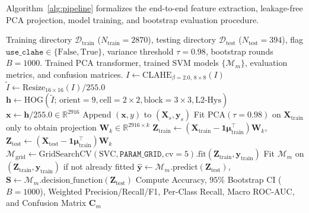 \documentclass[conference]{IEEEtran}
\begin{document}
Algorithm~\ref{alg:pipeline} formalizes the end-to-end feature extraction, leakage-free PCA projection, model training, and bootstrap evaluation procedure.

\begin{algorithm}[t]
\caption{End-to-End Brain Tumor MRI Classification with Optional Pre-Downsampling CLAHE, HOG, PCA, and SVM}
\label{alg:pipeline}
\footnotesize
\begin{algorithmic}[1]
\Require Training directory $\mathcal{D}_{\text{train}}$ ($N_{\text{train}}=2870$), testing directory $\mathcal{D}_{\text{test}}$ ($N_{\text{test}}=394$), flag $\texttt{use\_clahe} \in \{\text{False}, \text{True}\}$, variance threshold $\tau = 0.98$, bootstrap rounds $B = 1000$.
\Ensure Trained PCA transformer, trained SVM models $\{\mathcal{M}_m\}$, evaluation metrics, and confusion matrices.
            \State $I \gets \text{CLAHE}_{\beta=2.0, \, 8\times 8}(I)$ 
        \EndIf
        \State $\tilde{I} \gets \text{Resize}_{16 \times 16}(I) / 255.0$
        \State $\mathbf{h} \gets \text{HOG}(\tilde{I}; \, \text{orient}=9, \text{cell}=2\times 2, \text{block}=3\times 3, \text{L2-Hys})$
        \State $\mathbf{x} \gets \mathbf{h} / 255.0 \in \mathbb{R}^{2916}$
        \State Append $(\mathbf{x}, y)$ to $(\mathbf{X}_s, \mathbf{y}_s)$
    \EndFor
\EndFor
\State Fit $\text{PCA}(\tau=0.98)$ on $\mathbf{X}_{\text{train}}$ only to obtain projection $\mathbf{W}_k \in \mathbb{R}^{2916 \times k}$
\State $\mathbf{Z}_{\text{train}} \gets (\mathbf{X}_{\text{train}} - \mathbf{1}\boldsymbol{\mu}_{\text{train}}^\top)\mathbf{W}_k$, \quad $\mathbf{Z}_{\text{test}} \gets (\mathbf{X}_{\text{test}} - \mathbf{1}\boldsymbol{\mu}_{\text{train}}^\top)\mathbf{W}_k$
\State $\mathcal{M}_{\text{grid}} \gets \text{GridSearchCV}(\text{SVC}, \texttt{PARAM\_GRID}, \text{cv}=5).\text{fit}(\mathbf{Z}_{\text{train}}, \mathbf{y}_{\text{train}})$
    \State Fit $\mathcal{M}_m$ on $(\mathbf{Z}_{\text{train}}, \mathbf{y}_{\text{train}})$ if not already fitted
    \State $\hat{\mathbf{y}} \gets \mathcal{M}_m.\text{predict}(\mathbf{Z}_{\text{test}})$, \quad $\mathbf{S} \gets \mathcal{M}_m.\text{decision\_function}(\mathbf{Z}_{\text{test}})$
    \State Compute Accuracy, $95\%$ Bootstrap CI ($B=1000$), Weighted Precision/Recall/F1, Per-Class Recall, Macro ROC-AUC, and Confusion Matrix $\mathbf{C}_m$
\EndFor
\end{algorithmic}
\end{algorithm}
\end{document}
